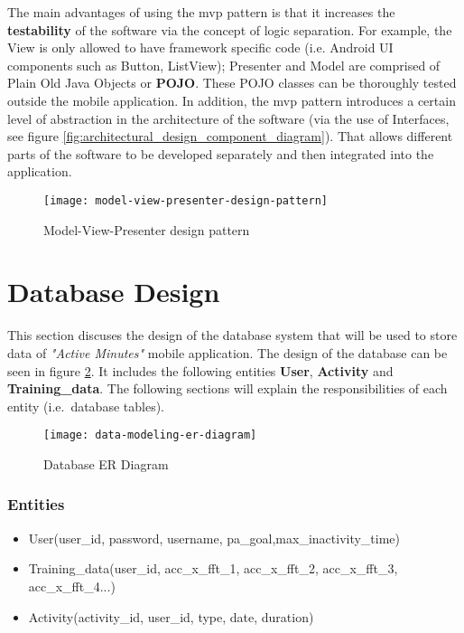         The main advantages of using the \gls{mvp} pattern is that it increases the \textbf{testability} of the software via the concept of logic separation. For example, the View is only allowed to have framework specific code (i.e. Android UI components such as Button, ListView); Presenter and Model are comprised of Plain Old Java Objects or \textbf{POJO}. These POJO classes can be thoroughly tested outside the mobile application. In addition, the \gls{mvp} pattern introduces a certain level of abstraction in the architecture of the software (via the use of Interfaces, see figure \ref{fig:architectural_design_component_diagram}). That allows different parts of the software to be developed separately and then integrated into the application.
    
        \begin{figure}[h!]
            \centering
            \texttt{[image: model-view-presenter-design-pattern]}
            \caption{Model-View-Presenter design pattern \citep[28]{syromiatnikov2014}}
            \label{fig:model_view_presenter_design_pattern}
        \end{figure}
   
    
    
    \section{Database Design}
    This section discuses the design of the database system that will be used to store data of \textit{"Active Minutes"} mobile application. The design of the database can be seen in figure \ref{fig:data_modeling_er_diagram}. It includes the following entities \textbf{User}, \textbf{Activity} and \textbf{Training\_data}. The following sections will explain the responsibilities of each entity (i.e.\ database tables).
        
        \begin{figure}[ht]
            \centering
            \texttt{[image: data-modeling-er-diagram]}
            \caption{Database ER Diagram}
            \label{fig:data_modeling_er_diagram}
        \end{figure}
        
        \subsubsection{Entities}
        
        \begin{itemize}
            \item User(user\_id, password, username, pa\_goal,max\_inactivity\_time)
            \item Training\_data(user\_id, acc\_x\_fft\_1, acc\_x\_fft\_2, acc\_x\_fft\_3, acc\_x\_fft\_4...)
            \item Activity(activity\_id, user\_id, type, date, duration)
        \end{itemize}
        
